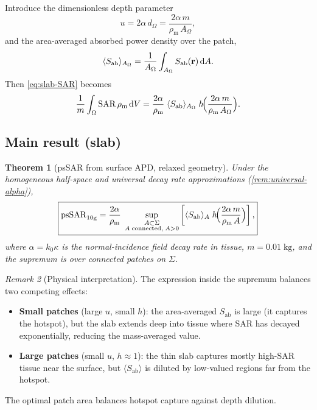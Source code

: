 \documentclass[11pt,a4paper]{article}
\newtheorem{theorem}{Theorem}
\theoremstyle{definition}
\theoremstyle{remark}
\newtheorem{remark}[theorem]{Remark}
\newcommand{\Sab}{S_{\mathrm{ab}}}
\newcommand{\SAR}{\ensuremath{\mathrm{SAR}}}
\newcommand{\psSAR}{\ensuremath{\mathrm{psSAR}_{10\mathrm{g}}}}
\newcommand{\rhom}{\rho_{\mathrm{m}}}
\begin{document}
Introduce the dimensionless depth parameter
\begin{equation}\label{eq:u-def}
  u = 2\alpha\,d_\Omega = \frac{2\alpha\,m}{\rhom\,A_\Omega},
\end{equation}
and the area-averaged absorbed power density over the patch,
\begin{equation}\label{eq:Sab-avg}
  \langle \Sab \rangle_{A_\Omega}
  = \frac{1}{A_\Omega}\int_{A_\Omega}\Sab(\vb{r})\,\mathrm{d}A.
\end{equation}
Then \cref{eq:slab-SAR} becomes
\begin{equation}\label{eq:slab-SAR-h}
  \frac{1}{m}\int_\Omega \SAR\,\rhom\,\mathrm{d}V
  = \frac{2\alpha}{\rhom}\;\langle \Sab \rangle_{A_\Omega}\;
    h\!\Bigl(\frac{2\alpha\,m}{\rhom\,A_\Omega}\Bigr).
\end{equation}

\subsection{Main result (slab)}

\begin{theorem}[psSAR from surface APD, relaxed geometry]\label{thm:main}
Under the homogeneous half-space and universal decay rate approximations
(\cref{rem:universal-alpha}),
\begin{equation}\label{eq:main}
  \boxed{%
    \psSAR
    = \frac{2\alpha}{\rhom}\;
      \sup_{\substack{A \subset \Sigma \\ A\;\text{connected},\; A > 0}}
      \left[
        \langle \Sab \rangle_A\;
        h\!\Bigl(\frac{2\alpha\,m}{\rhom\,A}\Bigr)
      \right],
  }
\end{equation}
where $\alpha = k_0\kappa$ is the normal-incidence field decay rate in tissue,
$m = 0.01\;\mathrm{kg}$, and the supremum is over connected patches on
$\Sigma$.
\end{theorem}

\begin{remark}[Physical interpretation]
The expression inside the supremum balances two competing effects:
\begin{itemize}[nosep]
\item \textbf{Small patches} (large $u$, small $h$): the area-averaged $\Sab$
  is large (it captures the hotspot), but the slab extends deep into tissue
  where SAR has decayed exponentially, reducing the mass-averaged value.
\item \textbf{Large patches} (small $u$, $h \approx 1$): the thin slab captures
  mostly high-SAR tissue near the surface, but $\langle \Sab \rangle$ is
  diluted by low-valued regions far from the hotspot.
\end{itemize}
The optimal patch area balances hotspot capture against depth dilution.
\end{remark}
\end{document}
